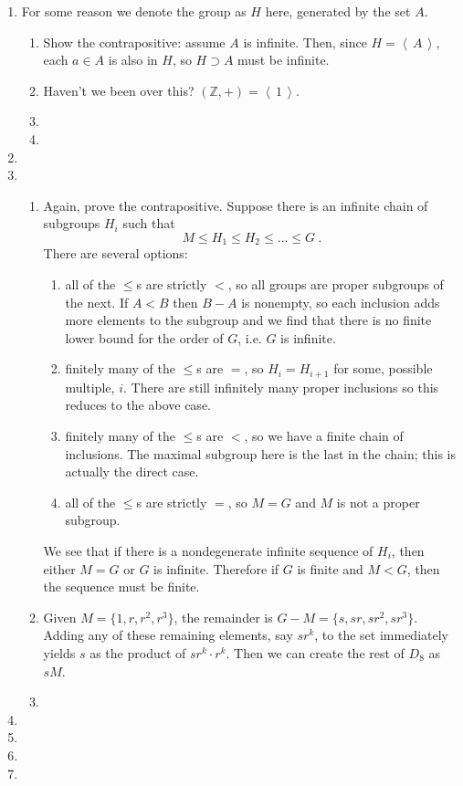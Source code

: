 \documentclass[]{article}
\newcommand{\gen}[1]{\left\langle\, #1 \,\right\rangle}
\newcommand{\bbz}{\mathbb{Z}}
\begin{document}
\begin{enumerate}
\item For some reason we denote the group as $H$ here, generated by the set $A$. 
\begin{enumerate}
\item Show the contrapositive: assume $A$ is infinite. Then, since $H = \gen{A}$, each $a\in A$ is also in $H$, so $H \supset A$ must be infinite.
\item Haven't we been over this? $(\bbz, +) = \gen{1}$.
\item 
\item 
\end{enumerate}


\item 


\item 
\begin{enumerate}
\item Again, prove the contrapositive. Suppose there is an infinite chain of subgroups $H_i$ such that
\begin{equation}
M \leq H_1 \leq H_2 \leq \ldots \leq G\ .
\end{equation}
There are several options: 
\begin{enumerate}
\item all of the $\leq$s are strictly $<$, so all groups are proper subgroups of the next. If $A < B$ then $B - A$ is nonempty, so each inclusion adds more elements to the subgroup and we find that there is no finite lower bound for the order of $G$, i.e. $G$ is infinite.
\item finitely many of the $\leq$s are $=$, so $H_i = H_{i+1}$ for some, possible multiple, $i$. There are still infinitely many proper inclusions so this reduces to the above case.
\item finitely many of the $\leq$s are $<$, so we have a finite chain of inclusions. The maximal subgroup here is the last in the chain; this is actually the direct case.
\item all of the $\leq$s are strictly $=$, so $M = G$ and $M$ is not a proper subgroup.
\end{enumerate}
We see that if there is a nondegenerate infinite sequence of $H_i$, then either $M = G$ or $G$ is infinite. Therefore if $G$ is finite and $M < G$, then the sequence must be finite.
\item Given $M = \{1, r, r^2, r^3\}$, the remainder is $G-M = \{s, sr, sr^2, sr^3\}$. Adding any of these remaining elements, say $sr^k$, to the set immediately yields $s$ as the product of $sr^k \cdot r^k$. Then we can create the rest of $D_8$ as $sM$. 
\item 

\end{enumerate}


\item 


\item 


\item 


\item 

\end{enumerate}
\end{document}
